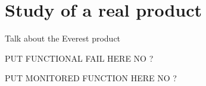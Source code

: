 \section{Study of a real product}
\label{sec:study-real-product}


Talk about the Everest product

PUT FUNCTIONAL FAIL HERE NO ?

PUT MONITORED FUNCTION HERE NO ?
